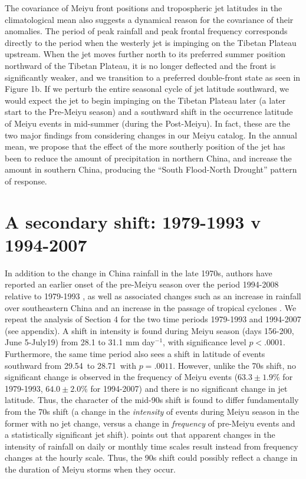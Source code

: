 \documentclass[draft,grl]{AGUTeX}
\begin{document}
\begin{article}
	The covariance of Meiyu front positions and tropospheric jet latitudes in the climatological mean also suggests a dynamical reason for the covariance of their anomalies. The period of peak rainfall and peak frontal frequency corresponds directly to the period when the westerly jet is impinging on the Tibetan Plateau upstream. When the jet moves further north to its preferred summer position northward of the Tibetan Plateau, it is no longer deflected and the front is significantly weaker, and we transition to a preferred double-front state as seen in Figure 1b. If we perturb the entire seasonal cycle of jet latitude southward, we would expect the jet to begin impinging on the Tibetan Plateau later (a later start to the Pre-Meiyu season) and a southward shift in the occurrence latitude of Meiyu events in mid-summer (during the Post-Meiyu). In fact, these are the two major findings from considering changes in our Meiyu catalog. In the annual mean, we propose that the effect of the more southerly position of the jet has been to reduce the amount of precipitation in northern China, and increase the amount in southern China, producing the ``South Flood-North Drought'' pattern of response.
	
\section{A secondary shift: 1979-1993 v 1994-2007}
	
	In addition to the change in China rainfall in the late 1970s, authors have reported an earlier onset of the pre-Meiyu season over the period 1994-2008 relative to 1979-1993 \citep{Kajikawa2012}, as well as associated changes such as an increase in rainfall over southeastern China and an increase in the passage of tropical cyclones \citep{Kwon2007,Chang2014}. We repeat the analysis of Section 4 for the two time periods 1979-1993 and 1994-2007 (see appendix). A shift in intensity is found during Meiyu season (days 156-200, June 5-July19) from 28.1 to 31.1 mm day$^{-1}$, with significance level $p<.0001$. Furthermore, the same time period also sees a shift in latitude of events southward from 29.54\textdegree\ to 28.71\textdegree\ with $p=.0011$. However, unlike the 70s shift, no significant change is observed in the frequency of Meiyu events ($63.3\pm 1.9\%$ for 1979-1993, $64.0\pm 2.0\%$ for 1994-2007) and there is no significant change in jet latitude. Thus, the character of the mid-90s shift is found to differ fundamentally from the 70s shift (a change in the \textit{intensity} of events during Meiyu season in the former with no jet change, versus a change in \textit{frequency} of pre-Meiyu events and a statistically significant jet shift). \citet{Biasutti2011} points out that apparent changes in the intensity of rainfall on daily or monthly time scales result instead from frequency changes at the hourly scale. Thus, the 90s shift could possibly reflect a change in the duration of Meiyu storms when they occur.
	

\end{article}
\end{document}
